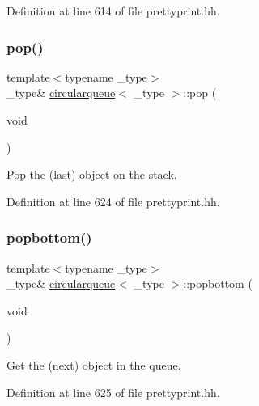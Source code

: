 Definition at line 614 of file prettyprint.\+hh.

\mbox{\label{classcircularqueue_abfb862a73808c55214d026eb43738f0b}} 
\subsubsection{\texorpdfstring{pop()}{pop()}}
{\footnotesize\ttfamily template$<$typename \+\_\+type$>$ \\
\+\_\+type\& \mbox{\hyperlink{classcircularqueue}{circularqueue}}$<$ \+\_\+type $>$\+::pop (\begin{DoxyParamCaption}\item[{void}]{ }\end{DoxyParamCaption})\hspace{0.3cm}{\ttfamily [inline]}}



Pop the (last) object on the stack. 



Definition at line 624 of file prettyprint.\+hh.

\mbox{\label{classcircularqueue_a5d1e7b79b064d02539960ea2a3e0d8cf}} 
\subsubsection{\texorpdfstring{popbottom()}{popbottom()}}
{\footnotesize\ttfamily template$<$typename \+\_\+type$>$ \\
\+\_\+type\& \mbox{\hyperlink{classcircularqueue}{circularqueue}}$<$ \+\_\+type $>$\+::popbottom (\begin{DoxyParamCaption}\item[{void}]{ }\end{DoxyParamCaption})\hspace{0.3cm}{\ttfamily [inline]}}



Get the (next) object in the queue. 



Definition at line 625 of file prettyprint.\+hh.

